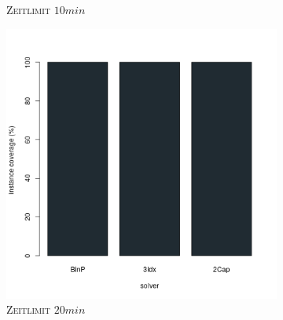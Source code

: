 \begin{figure}[H]
\begin{subfigure}[b]{0.3\textwidth}
\caption{\textsc{Zeitlimit} $10min$}
\label{fig:instance_cov_b=2_m_b}
\end{subfigure}
\hfill
\begin{subfigure}[b]{0.3\textwidth}
\centering
\includegraphics[width=1.2\textwidth]{img/solver_instance_coverage_b=2_m_1200s.png}
\caption{\textsc{Zeitlimit} $20min$}
\label{fig:instance_cov_b=2_m_c}
\end{subfigure}
\caption{}
\label{fig:instance_cov_b=2}
\end{figure}

